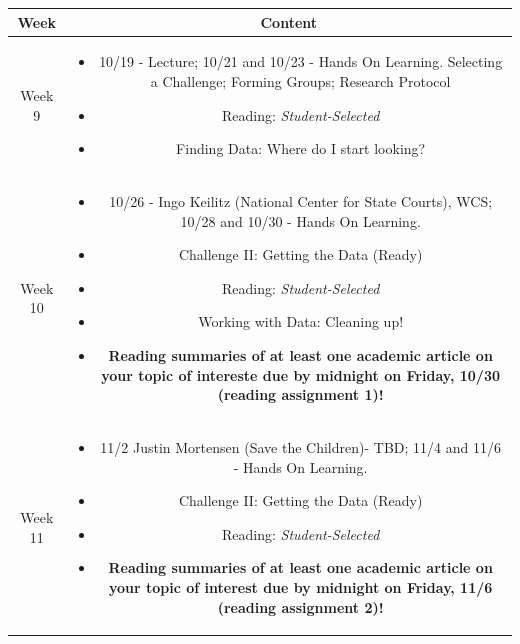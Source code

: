 \documentclass[11pt]{article}
\begin{document}
\begin{table}[h!]
\small %
\begin{tabular}{ | c | c | }
\hline
\textbf{Week} & \textbf{Content} \\
\hline

Week 9 & \begin{minipage}{.85\textwidth}
\begin{itemize} \itemsep-0.4em
	\vspace{1mm}
	\item 10/19 - Lecture; 10/21 and 10/23 - Hands On Learning.
	Selecting a Challenge; Forming Groups; Research Protocol
	\item Reading: \textit{Student-Selected}
	\item Finding Data: Where do I start looking?
	\vspace{1mm}
\end{itemize}
\end{minipage} \\
\hline

Week 10 & \begin{minipage}{.85\textwidth}
\begin{itemize} \itemsep-0.4em
	\vspace{1mm}
	\item 10/26 - Ingo Keilitz (National Center for State Courts), WCS; 10/28 and 10/30 - Hands On Learning.
	\item Challenge II: Getting the Data (Ready)
	\item Reading: \textit{Student-Selected}
	\item Working with Data: Cleaning up!
	\item \textbf{Reading summaries of at least one academic article on your topic of intereste due by midnight on Friday, 10/30 (reading assignment 1)!}
	\vspace{1mm}
\end{itemize}
\end{minipage} \\
\hline

Week 11 & \begin{minipage}{.85\textwidth}
\begin{itemize} \itemsep-0.4em
	\vspace{1mm}
	\item 11/2 Justin Mortensen (Save the Children)- TBD; 11/4 and 11/6 - Hands On Learning.
	\item Challenge II: Getting the Data (Ready)
	\item Reading: \textit{Student-Selected}
	\item \textbf{Reading summaries of at least one academic article on your topic of interest due by midnight on Friday, 11/6 (reading assignment 2)!}
	

\end{itemize}
\end{minipage}
\end{tabular}
\end{table}
\end{document}
